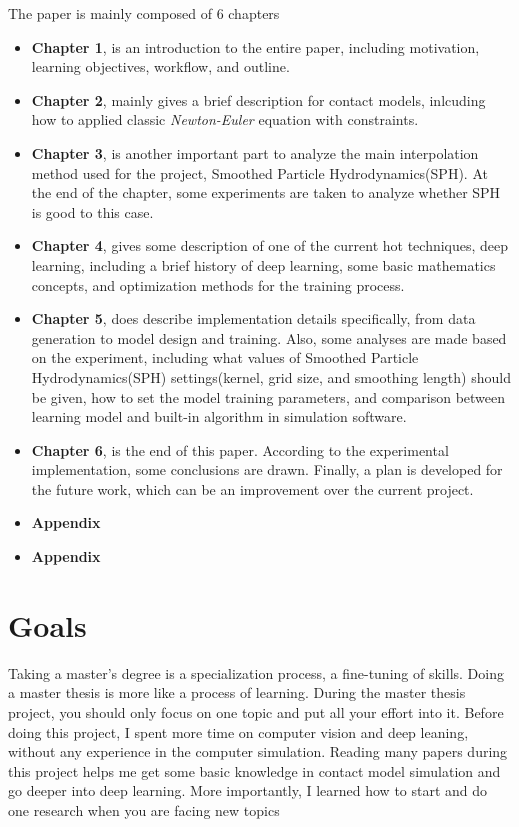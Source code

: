         The paper is mainly composed of 6 chapters
    \begin{itemize}
        \item \textbf{Chapter 1}, is an introduction to the entire paper, including motivation, learning objectives, workflow, and outline.

        \item \textbf{Chapter 2}, mainly gives a brief description for contact models, inlcuding how to applied classic \textit{Newton-Euler} equation with constraints.

        \item \textbf{Chapter 3}, is another important part to analyze the main interpolation method used for the project, Smoothed Particle Hydrodynamics(SPH). At the end of the chapter, some experiments are taken to analyze whether SPH is good to this case.

        \item \textbf{Chapter 4}, gives some description of one of the current hot techniques, deep learning, including a brief history of deep learning, some basic mathematics concepts, and optimization methods for the training process.

        \item \textbf{Chapter 5}, does describe implementation details specifically, from data generation to model design and training. Also, some analyses are made based on the experiment, including what values of Smoothed Particle Hydrodynamics(SPH) settings(kernel, grid size, and smoothing length) should be given, how to set the model training parameters, and comparison between learning model and built-in algorithm in simulation software.

        \item \textbf{Chapter 6}, is the end of this paper. According to the experimental implementation, some conclusions are drawn. Finally, a plan is developed for the future work, which can be an improvement over the current project.

        \item \textbf{Appendix}

        \item \textbf{Appendix}
    \end{itemize}


\section{Goals}
    Taking a master’s degree is a specialization process, a fine-tuning of skills. Doing a master thesis is more like a process of learning. During the master thesis project, you should only focus on one topic and put all your effort into it. Before doing this project, I spent more time on computer vision and deep leaning, without any experience in the computer simulation. Reading many papers during this project helps me get some basic knowledge in contact model simulation and go deeper into deep learning. More importantly, I learned how to start and do one research when you are facing new topics 

